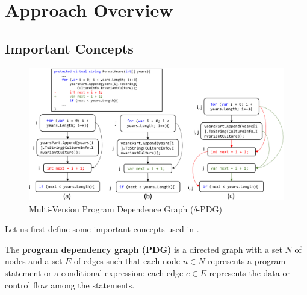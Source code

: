 \section{Approach Overview}
\label{overview:sec}

\subsection{Important Concepts}
\label{concepts:sec}

\begin{figure}[t]
	\centering
	\includegraphics[width=5.3in]{figures/multi-version-graph-2.png}
	\vspace{-6pt}
	\caption{Multi-Version Program Dependence Graph ($\delta$-PDG)}
	\label{fig:multi-version-pdg}
\end{figure}

Let us first define some important concepts used in {\tool}.


\begin{Definition}
The \textbf{program dependency graph (PDG)} is a directed graph with
a set $N$ of nodes and a set $E$ of edges such that each node $n \in N$
represents a program statement or a conditional expression; each edge
$e \in E$ represents the data or control flow among the statements.
\end{Definition}

